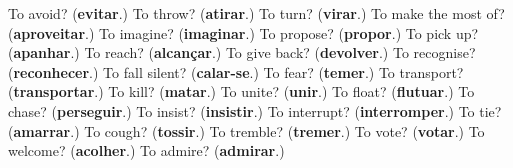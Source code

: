 \begin{tcolorbox}[breakable,colback=teal!4,colframe=teal!35!black,title={Before you move on}]
To avoid? (\textbf{evitar}.) To throw? (\textbf{atirar}.) To turn? (\textbf{virar}.) To make the most of? (\textbf{aproveitar}.) To imagine? (\textbf{imaginar}.) To propose? (\textbf{propor}.) To pick up? (\textbf{apanhar}.) To reach? (\textbf{alcançar}.) To give back? (\textbf{devolver}.) To recognise? (\textbf{reconhecer}.) To fall silent? (\textbf{calar-se}.) To fear? (\textbf{temer}.) To transport? (\textbf{transportar}.) To kill? (\textbf{matar}.) To unite? (\textbf{unir}.) To float? (\textbf{flutuar}.) To chase? (\textbf{perseguir}.) To insist? (\textbf{insistir}.) To interrupt? (\textbf{interromper}.) To tie? (\textbf{amarrar}.) To cough? (\textbf{tossir}.) To tremble? (\textbf{tremer}.) To vote? (\textbf{votar}.) To welcome? (\textbf{acolher}.) To admire? (\textbf{admirar}.)
\end{tcolorbox}
